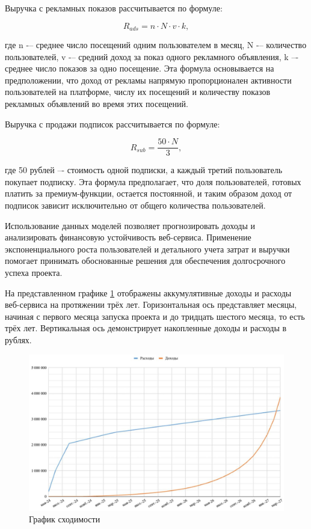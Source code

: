 Выручка с рекламных показов рассчитывается по формуле:

$$R_{ads} = n \cdot N \cdot v \cdot k,$$

где n -– среднее число посещений одним пользователем в месяц, N -– количество пользователей, v -– средний доход за показ одного рекламного объявления, k –- среднее число показов за одно посещение. Эта формула основывается на предположении, что доход от рекламы напрямую пропорционален активности пользователей на платформе, числу их посещений и количеству показов рекламных объявлений во время этих посещений.

Выручка с продажи подписок рассчитывается по формуле:

$$R_{sub} = \dfrac{50 \cdot N}{3},$$

где 50 рублей –- стоимость одной подписки, а каждый третий пользователь покупает подписку. Эта формула предполагает, что доля пользователей, готовых платить за премиум-функции, остается постоянной, и таким образом доход от подписок зависит исключительно от общего количества пользователей.

Использование данных моделей позволяет прогнозировать доходы и анализировать финансовую устойчивость веб-сервиса. Применение экспоненциального роста пользователей и детального учета затрат и выручки помогает принимать обоснованные решения для обеспечения долгосрочного успеха проекта.

На представленном графике \ref{fig:shodimost} отображены аккумулятивные доходы и расходы веб-сервиса на протяжении трёх лет. Горизонтальная ось представляет месяцы, начиная с первого месяца запуска проекта и до тридцать шестого месяца, то есть трёх лет. Вертикальная ось демонстрирует накопленные доходы и расходы в рублях.

\begin{figure}[H]
\begin{center}
	\includegraphics[width=0.95\linewidth]{src/img/3/shodimost}
	\caption{График сходимости}
	\label{fig:shodimost}
\end{center}
\end{figure}

